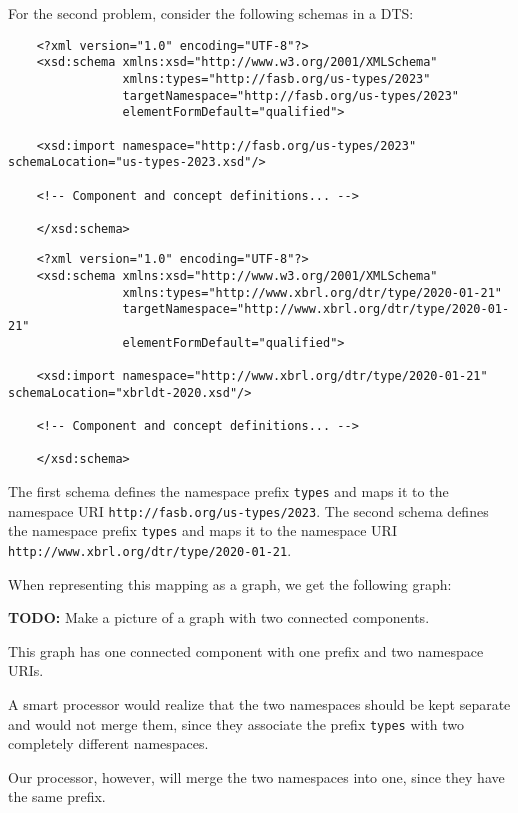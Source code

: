 For the second problem, consider the following schemas in a DTS:

\begin{lstlisting}
    <?xml version="1.0" encoding="UTF-8"?>
    <xsd:schema xmlns:xsd="http://www.w3.org/2001/XMLSchema"
                xmlns:types="http://fasb.org/us-types/2023"
                targetNamespace="http://fasb.org/us-types/2023"
                elementFormDefault="qualified">
    
    <xsd:import namespace="http://fasb.org/us-types/2023" schemaLocation="us-types-2023.xsd"/>

    <!-- Component and concept definitions... -->

    </xsd:schema>
\end{lstlisting}

\begin{lstlisting}
    <?xml version="1.0" encoding="UTF-8"?>
    <xsd:schema xmlns:xsd="http://www.w3.org/2001/XMLSchema"
                xmlns:types="http://www.xbrl.org/dtr/type/2020-01-21"
                targetNamespace="http://www.xbrl.org/dtr/type/2020-01-21"
                elementFormDefault="qualified">
    
    <xsd:import namespace="http://www.xbrl.org/dtr/type/2020-01-21" schemaLocation="xbrldt-2020.xsd"/>

    <!-- Component and concept definitions... -->

    </xsd:schema>
\end{lstlisting}

The first schema defines the namespace prefix \texttt{types} and maps it to the namespace URI \texttt{http://fasb.org/us-types/2023}.
The second schema defines the namespace prefix \texttt{types} and maps it to the namespace URI \texttt{http://www.xbrl.org/dtr/type/2020-01-21}.

When representing this mapping as a graph, we get the following graph:

\textbf{TODO:} Make a picture of a graph with two connected components.

This graph has one connected component with one prefix and two namespace URIs.

A smart processor would realize that the two namespaces should be kept separate and would not merge them, 
since they associate the prefix \texttt{types} with two completely different namespaces.

Our processor, however, will merge the two namespaces into one, since they have the same prefix.
